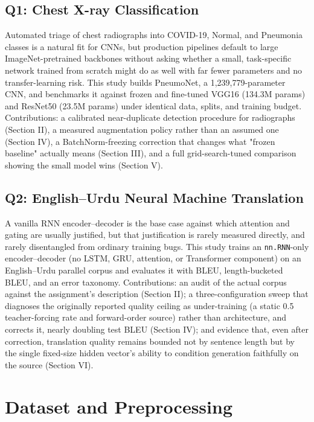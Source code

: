 \documentclass[conference]{IEEEtran}
\begin{document}
\subsection{Q1: Chest X-ray Classification}
Automated triage of chest radiographs into COVID-19, Normal, and
Pneumonia classes is a natural fit for CNNs, but production pipelines
default to large ImageNet-pretrained backbones without asking whether a
small, task-specific network trained from scratch might do as well with
far fewer parameters and no transfer-learning risk. This study builds
PneumoNet, a 1,239,779-parameter CNN, and benchmarks it against frozen
and fine-tuned VGG16 (134.3M params) and ResNet50 (23.5M params) under
identical data, splits, and training budget. Contributions: a
calibrated near-duplicate detection procedure for radiographs (Section
II), a measured augmentation policy rather than an assumed one (Section
IV), a BatchNorm-freezing correction that changes what "frozen baseline"
actually means (Section III), and a full grid-search-tuned comparison
showing the small model wins (Section V).

\subsection{Q2: English--Urdu Neural Machine Translation}
A vanilla RNN encoder--decoder is the base case against which attention
and gating are usually justified, but that justification is rarely
measured directly, and rarely disentangled from ordinary training
bugs. This study trains an \texttt{nn.RNN}-only encoder--decoder (no
LSTM, GRU, attention, or Transformer component) on an English--Urdu
parallel corpus and evaluates it with BLEU, length-bucketed BLEU, and
an error taxonomy. Contributions: an audit of the actual corpus against
the assignment's description (Section II); a three-configuration sweep
that diagnoses the originally reported quality ceiling as
under-training (a static 0.5 teacher-forcing rate and forward-order
source) rather than architecture, and corrects it, nearly doubling test
BLEU (Section IV); and evidence that, even after correction,
translation quality remains bounded not by sentence length but by the
single fixed-size hidden vector's ability to condition generation
faithfully on the source (Section VI).

\section{Dataset and Preprocessing}
\end{document}
